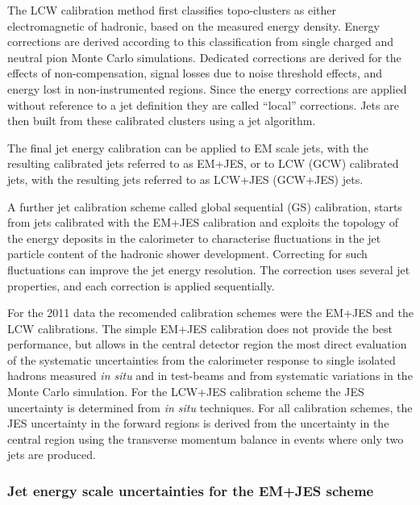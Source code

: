 \begin{itemize}
The LCW calibration method first classifies topo-clusters as either electromagnetic of hadronic, based on the measured energy density. Energy corrections are derived according to this classification from single charged and neutral pion Monte Carlo simulations. Dedicated corrections are derived for the effects of non-compensation, signal losses due to noise threshold effects, and energy lost in non-instrumented regions. Since the energy corrections are applied without reference to a jet definition they are called ``local'' corrections. Jets are then built from these calibrated clusters using a jet algorithm.  

The final jet energy calibration can be applied to EM scale jets, with the resulting calibrated jets referred to as EM+JES, or to LCW (GCW) calibrated jets, with the resulting jets referred to as LCW+JES (GCW+JES) jets.

A further jet calibration scheme called global sequential (GS) calibration, starts from jets calibrated with the EM+JES calibration and exploits the topology of the energy deposits in the calorimeter to characterise fluctuations in the jet particle content of the hadronic shower development.  Correcting for such fluctuations can improve the jet energy resolution. The correction uses several jet properties, and each correction is applied sequentially.


For the 2011 data the recomended calibration schemes were the EM+JES and the LCW calibrations. The simple EM+JES calibration does not provide the best performance, but allows in the central detector region the most direct evaluation of the systematic uncertainties from the calorimeter response to single isolated hadrons measured \emph{in situ}  and in test-beams and from systematic variations in the Monte Carlo simulation.  For the LCW+JES calibration scheme the JES uncertainty is determined from \emph{in situ}  techniques. For all calibration schemes, the JES uncertainty in the forward regions is derived from the uncertainty in the central region using the transverse momentum balance in events where only two jets are produced. 



\subsubsection{Jet energy scale uncertainties for the EM+JES scheme}


\end{itemize}
